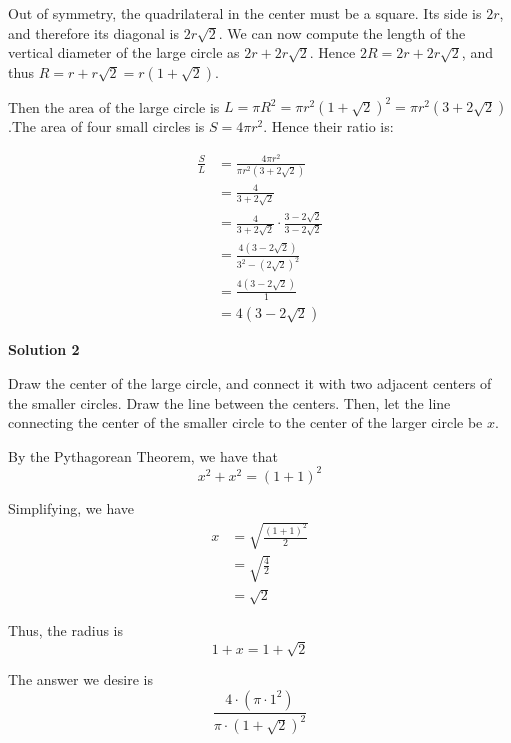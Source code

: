 \begin{enumerate}
 Out of symmetry, the quadrilateral in the center must be a square. Its side is $2r$, and therefore its diagonal is $2r\sqrt{2}$. We can now compute the length of the vertical diameter of the large circle as $2r + 2r\sqrt{2}$. Hence $2R=2r + 2r\sqrt{2}$, and thus $R=r+r\sqrt{2}=r(1+\sqrt{2})$.

 Then the area of the large circle is $L = \pi R^2 = \pi r^2 (1+\sqrt 2)^2 = \pi r^2 (3+2\sqrt 2)$.The area of four small circles is $S = 4\pi r^2$. Hence their ratio is:

 
 \begin{align*} \frac SL  & = \frac{4\pi r^2}{\pi r^2 (3+2\sqrt 2)} \\ & = \frac 4{3+2\sqrt 2} \\ & = \frac 4{3+2\sqrt 2} \cdot \frac{3-2\sqrt 2}{3 - 2\sqrt 2} \\ & = \frac{4(3 - 2\sqrt 2)}{3^2 - (2\sqrt 2)^2} \\ & = \frac{4(3 - 2\sqrt 2)}1 \\ & = \boxed{4(3 - 2\sqrt 2)} \end{align*}





\textbf{Solution 2}

Draw the center of the large circle, and connect it with two adjacent centers of the smaller circles. Draw the line between the centers. Then, let the line connecting the center of the smaller circle to the center of the larger circle be $x.$

 By the Pythagorean Theorem, we have that 
 \[x^2 + x^2 = (1+1)^2\]

 Simplifying, we have 
 \begin{align*} x &= \sqrt{\frac{(1+1)^2}{2}} \\ &= \sqrt{\frac{4}{2}} \\ &= \sqrt{2} \end{align*}


 Thus, the radius is 
 \[1 + x = 1 + \sqrt{2}\]

 The answer we desire is 
 \[\frac{4 \cdot \left(\pi \cdot 1^2 \right)}{\pi \cdot (1+\sqrt{2})^2}\]


\end{enumerate}
